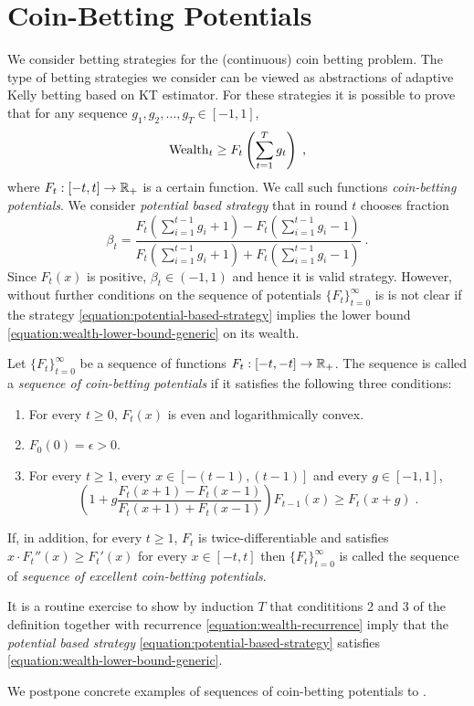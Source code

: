 \section{Coin-Betting Potentials}

We consider betting strategies for the (continuous) coin betting problem. The
type of betting strategies we consider can be viewed as abstractions of
adaptive Kelly betting based on KT estimator. For these strategies
it is possible to prove that for any sequence $g_1, g_2, \dots, g_T \in [-1,1]$,
\begin{equation}
\label{equation:wealth-lower-bound-generic}
\operatorname{Wealth}_t \ge F_t \left( \sum_{t=1}^T g_t \right) \; ,
\end{equation}
where $F_t:[-t,t] \to \mathbb{R}_+$ is a certain function. We call such functions
\emph{coin-betting potentials}. We consider \emph{potential based strategy}
that in round $t$ chooses fraction
\begin{equation}
\label{equation:potential-based-strategy}
\beta_t = \frac{F_t(\sum_{i=1}^{t-1} g_i + 1) - F_t(\sum_{i=1}^{t-1} g_i - 1)}{F_t(\sum_{i=1}^{t-1} g_i + 1) + F_t(\sum_{i=1}^{t-1} g_i - 1)} \; .
\end{equation}
Since $F_t(x)$ is positive, $\beta_t \in (-1,1)$ and hence it is valid strategy.
However, without further conditions on the sequence of potentials
$\{F_t\}_{t=0}^\infty$ is is not clear if the strategy
\eqref{equation:potential-based-strategy} implies the lower bound
\eqref{equation:wealth-lower-bound-generic} on its wealth.

\begin{definition}
Let $\{F_t\}_{t=0}^\infty$ be a sequence of functions $F_t:[-t,-t] \to \mathbb{R}_+$. The
sequence is called a \emph{sequence of coin-betting potentials} if it satisfies
the following three conditions:
\begin{enumerate}
\item For every $t \ge 0$, $F_t(x)$ is even and logarithmically convex.
\item $F_0(0) = \epsilon > 0$.
\item For every $t \ge 1$, every $x \in [-(t-1), (t-1)]$ and every $g \in [-1,1]$,
$$
\left(1 + g \frac{F_t(x + 1) - F_t(x - 1)}{F_t(x + 1) + F_t(x - 1)} \right) F_{t-1}(x) \ge F_t(x+g) \; .
$$
\end{enumerate}
If, in addition, for every $t \ge 1$, $F_t$ is twice-differentiable and
satisfies $x \cdot F_t''(x) \ge F_t'(x)$ for every $x \in [-t,t]$ then
$\{F_t\}_{t=0}^\infty$ is called the sequence of \emph{sequence of excellent
coin-betting potentials}.
\end{definition}

It is a routine exercise to show by induction $T$ that condititions 2 and 3 of
the definition together with recurrence \eqref{equation:wealth-recurrence}
imply that the \emph{potential based strategy}
\eqref{equation:potential-based-strategy} satisfies
\eqref{equation:wealth-lower-bound-generic}.

We postpone concrete examples of sequences of coin-betting potentials to
\label{section:kt-estimator}.
